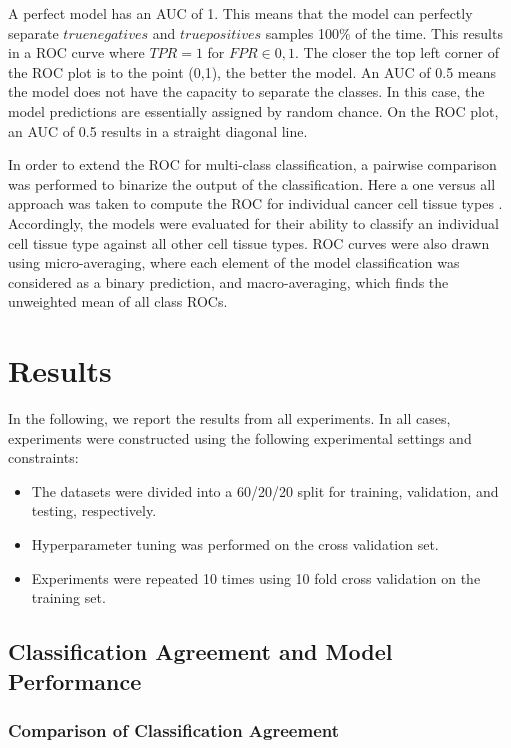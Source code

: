 \noindent
A perfect model has an AUC of 1. This means that the model can perfectly separate $true negatives$ and $true positives$ samples 100\% of the time. This results in a ROC curve where $TPR = 1$ for $FPR \in {0,1}$. The closer the top left corner of the ROC plot is to the point (0,1), the better the model. An AUC of 0.5 means the model does not have the capacity to separate the classes. In this case, the model predictions are essentially assigned by random chance. On the ROC plot, an AUC of 0.5 results in a straight diagonal line.

In order to extend the ROC for multi-class classification, a pairwise comparison was performed to binarize the output of the classification. Here a one versus all approach was taken to compute the ROC for individual cancer cell tissue types \cite{allwein2000reducing}. Accordingly, the models were evaluated for their ability to classify an individual cell tissue type against all other cell tissue types. ROC curves were also drawn using micro-averaging, where each element of the model classification was considered as a binary prediction, and macro-averaging, which finds the unweighted mean of all class ROCs.

\section{Results}

In the following, we report the results from all experiments. In all cases, experiments were constructed using the following experimental settings and constraints:

\begin{itemize}
    \item The datasets were divided into a 60/20/20 split for training, validation, and testing, respectively.
    \item Hyperparameter tuning was performed on the cross validation set.
    \item Experiments were repeated 10 times using 10 fold cross validation on the training set.
\end{itemize}

\subsection{Classification Agreement and Model Performance}\label{subsec:classA}

\subsubsection{Comparison of Classification Agreement} 

